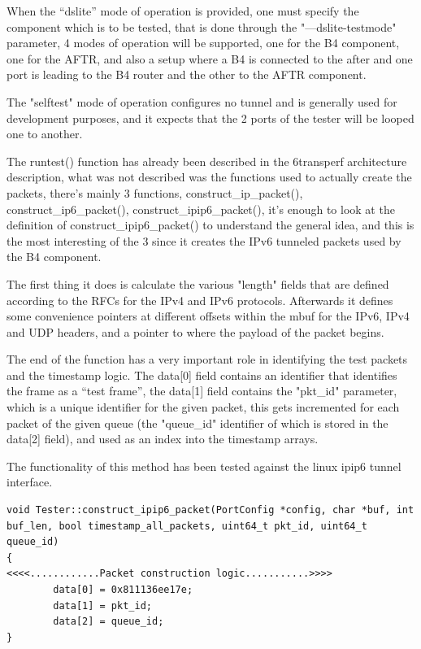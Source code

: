 \documentclass[a4paper,12p,titlepage]{article}
\begin{document}
When the “dslite” mode of operation is provided, one must specify the component which is to be tested, that is done through the "—dslite-testmode" parameter,  4 modes of operation will be supported, one for the B4 component, one for the AFTR, and also a setup where a B4 is connected to the after and one port is leading to the B4 router and the other to the AFTR component.

The "selftest" mode of operation configures no tunnel and is generally used for development purposes, and it expects that the 2 ports of the tester will be looped one to another.

The runtest() function has already been described in the 6transperf architecture description, what was not described was the functions used to actually create the packets, there’s mainly 3 functions, construct\_ip\_packet(), construct\_ip6\_packet(), construct\_ipip6\_packet(), it’s enough to look at the definition of construct\_ipip6\_packet() to understand the general idea, and this is the most interesting of the 3 since it creates the IPv6 tunneled packets used by the B4 component.

The first thing it does is calculate the various "length" fields that are defined according to the RFCs for the IPv4 and IPv6 protocols. Afterwards it defines some convenience pointers at different offsets within the mbuf for the IPv6, IPv4 and UDP headers, and a pointer to where the payload of the packet begins.

The end of the function has a very important role in identifying the test packets and the timestamp logic. The data[0] field contains an identifier that identifies the frame as a “test frame”, the data[1] field contains the "pkt\_id" parameter, which is a unique identifier for the given packet, this gets incremented for each packet of the given queue (the "queue\_id" identifier of which is stored in the data[2] field), and used as an index into the timestamp arrays.

The functionality of this method has been tested against the linux ipip6 tunnel interface.

\begin{frame}

\lstset{language=C++,breaklines=true,numbers=left}
\begin{lstlisting}
void Tester::construct_ipip6_packet(PortConfig *config, char *buf, int buf_len, bool timestamp_all_packets, uint64_t pkt_id, uint64_t queue_id)
{
<<<<............Packet construction logic...........>>>>
        data[0] = 0x811136ee17e;
        data[1] = pkt_id;
        data[2] = queue_id;
}

\end{lstlisting}
\end{frame}
\end{document}
